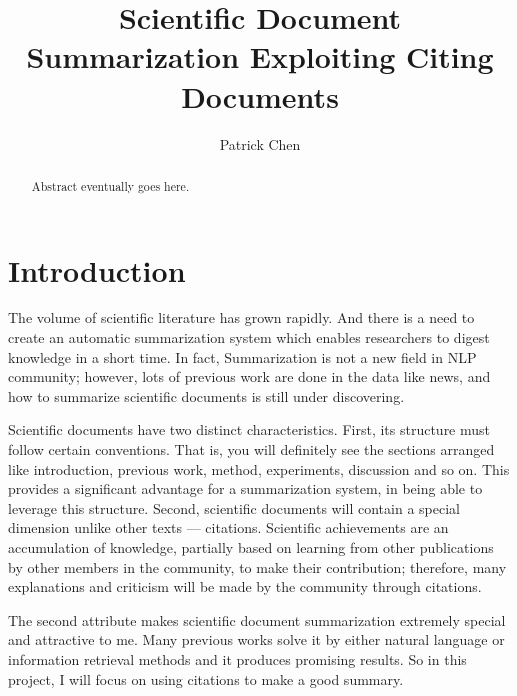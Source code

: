\documentclass[hyp]{socreport}
\begin{document}
\title{Scientific Document Summarization Exploiting Citing Documents}
\author{Patrick Chen}
\maketitle

\begin{abstract}
Abstract eventually goes here.
\end{abstract}

\section{Introduction}

  The volume of scientific literature has grown rapidly. And there is
  a need to create an automatic 
summarization system which enables researchers to digest knowledge in
a short time. In fact, Summarization 
is not a new field in NLP community; however, lots of previous work
are done in the data like news, and how 
to summarize scientific documents is still under discovering.

  Scientific documents have two distinct characteristics. First, its
  structure must follow certain conventions. 
That is, you will definitely see the sections arranged like
introduction, previous work, method, experiments, 
discussion and so on. This provides a significant advantage for a
summarization system, in being able to leverage this 
structure. Second, scientific documents will contain a special
dimension unlike other texts –-- citations. Scientific achievements 
are an accumulation of knowledge, partially based on learning from
other publications by other members in the community, to make their 
contribution; therefore, many explanations and criticism will be made
by the community through citations.  

  The second attribute makes scientific document summarization
  extremely special and attractive to me.
Many 
previous works solve it by either natural language or information
retrieval methods and it produces promising 
results. So in this project, I will focus on using citations to make a
good summary.   
\end{document}
